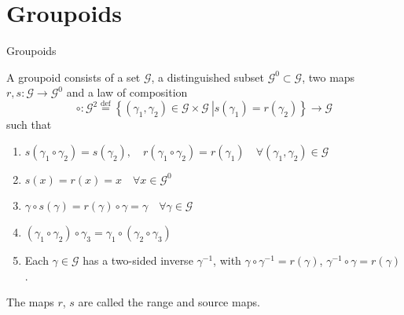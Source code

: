 \documentclass{beamer}
\theoremstyle{plain}
\newcommand{\G}{\mathcal{G}}
\newcommand{\ga}{\gamma}
\newcommand{\bydef}{\stackrel{\mathrm{def}}{=}}
\begin{document}
\section{Groupoids}

\begin{frame}
		\begin{center}
\huge {Groupoids} \normalsize\\	
	\end{center}
\begin{definition}

	A \alert{groupoid} consists of a set $\G$, a distinguished subset $\G^0\subset\G$, two maps
	$r, s : \G\to \G^0$ and a law of composition
	$$
	\circ: \G^2\bydef\left\{\left.\left(\ga_1,\ga_2 \right) \in \G\times\G~\right| s\left(\ga_1\right)= r\left(\ga_2\right)\right\}\to \G
	$$
	such that
	\begin{enumerate}
		\item $s\left(\ga_1\circ\ga_2\right)=s\left(\ga_2\right), \quad r\left(\ga_1\circ\ga_2\right)=r\left(\ga_1\right)\quad \forall\left(\ga_1, \ga_2 \right) \in \G$
		\item $s\left(x\right)=r\left(x\right)=x \quad\forall x\in\G^0$
		\item $\ga\circ s\left(\ga\right)= r\left(\ga\right)\circ\ga = \ga\quad \forall\ga\in\G$
		\item $\left( \ga_1\circ\ga_2\right) \circ\ga_3=\ga_1\circ\left( \ga_2\circ\ga_3\right) $
		\item Each $\ga \in\G$ has a two-sided inverse $\ga^{-1}$, with $\ga\circ\ga^{-1}=r\left(\ga\right)$, $\ga^{-1}\circ\ga=r\left(\ga\right)$.
	\end{enumerate}
	The maps $r$, $s$ are called the \alert{range} and \alert{source} maps.
\end{definition}

\end{frame}
\end{document}
